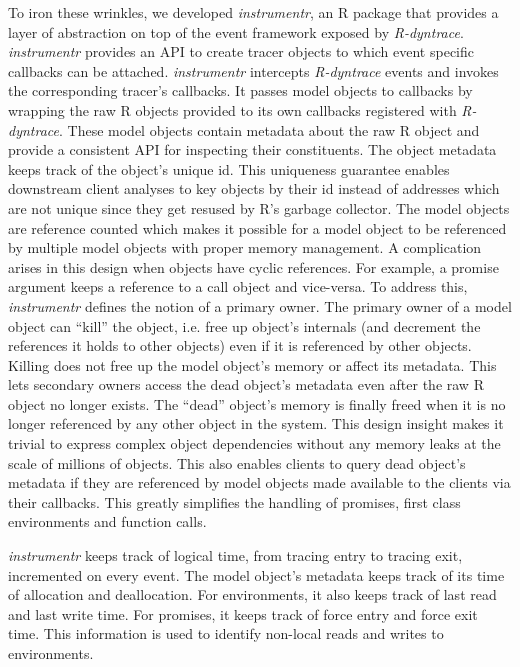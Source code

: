 \documentclass[screen,acmsmall]{acmart}
\begin{document}
To iron these wrinkles, we developed \emph{instrumentr}, an R package that
provides a layer of abstraction on top of the event framework exposed by
\emph{R-dyntrace}. \emph{instrumentr} provides an API to create tracer objects
to which event specific callbacks can be attached. \emph{instrumentr} intercepts
\emph{R-dyntrace} events and invokes the corresponding tracer's callbacks. It
passes model objects to callbacks by wrapping the raw R objects provided to its
own callbacks registered with \emph{R-dyntrace}. These model objects contain
metadata about the raw R object and provide a consistent API for inspecting
their constituents. The object metadata keeps track of the object's unique id.
This uniqueness guarantee enables downstream client analyses to key objects by
their id instead of addresses which are not unique since they get resused by R's
garbage collector. The model objects are reference counted which makes it
possible for a model object to be referenced by multiple model objects with
proper memory management. A complication arises in this design when objects have
cyclic references. For example, a promise argument keeps a reference to a call
object and vice-versa. To address this, \emph{instrumentr} defines the notion of
a primary owner. The primary owner of a model object can ``kill'' the object,
i.e. free up object's internals (and decrement the references it holds to other
objects) even if it is referenced by other objects. Killing does not free up the
model object's memory or affect its metadata. This lets secondary owners access
the dead object's metadata even after the raw R object no longer exists. The
``dead'' object's memory is finally freed when it is no longer referenced by any
other object in the system. This design insight makes it trivial to express
complex object dependencies without any memory leaks at the scale of millions of
objects. This also enables clients to query dead object's metadata if they are
referenced by model objects made available to the clients via their callbacks.
This greatly simplifies the handling of promises, first class environments and
function calls.

\emph{instrumentr} keeps track of logical time, from tracing
entry to tracing exit, incremented on every event. The model object's metadata
keeps track of its time of allocation and deallocation. For environments, it
also keeps track of last read and last write time. For promises, it keeps track
of force entry and force exit time. This information is used to identify
non-local reads and writes to environments.
\end{document}
